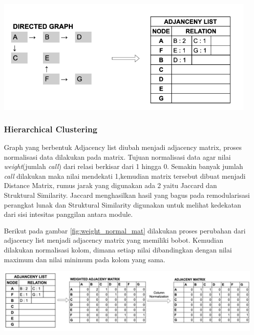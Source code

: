 \begin{center}
	\includegraphics[width=13cm]{img/bab_3/dg_al.png}
	\label{fig:dg_al}
\end{center}

\subsubsection{Hierarchical Clustering}
Graph yang berbentuk Adjacency list diubah menjadi adjacency matrix, proses normalisasi data dilakukan pada matrix. Tujuan normalisasi data agar nilai \textit{weight}(jumlah \textit{call}) dari relasi berkisar dari 1 hingga 0. Semakin banyak jumlah \textit{call} dilakukan maka nilai mendekati 1,kemudian matrix tersebut dibuat menjadi Distance Matrix, rumus jarak yang digunakan ada 2 yaitu Jaccard dan Struktural Similarity. Jaccard menghasilkan hasil yang bagus pada remodularisasi perangkat lunak dan Struktural Similarity digunakan untuk melihat kedekatan dari sisi intesitas panggilan antara module.

Berikut pada gambar \ref{fig:weight_normal_mat} dilakukan proses perubahan dari adjacency list menjadi adjacency matrix yang memiliki bobot. Kemudian dilakukan normalisasi kolom, dimana setiap nilai dibandingkan dengan nilai maximum dan nilai minimum pada kolom yang sama. 

\begin{center}
	\includegraphics[width=14cm]{img/bab_3/weight_normal_mat.png}
	\label{fig:weight_normal_mat}
\end{center}

